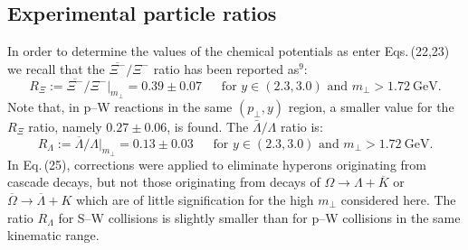 \begin{mdframed}[linecolor=gray,roundcorner=12pt,backgroundcolor=Dandelion!15,linewidth=1pt,leftmargin=0cm,rightmargin=0cm,topline=true,bottomline=true,skipabove=12pt]
\subsection*{Experimental particle ratios} 
In order to determine the values of the chemical potentials as enter
Eqs.\,(22,23) we recall that the $\overline{\Xi^-}/ \Xi^-$
ratio has been reported as$^9$:
\begin{equation}
\tag{24} R_\Xi:={\overline{\Xi^-}}/ \Xi^-|_{m_\bot} 
 = 0.39\pm 0.07\ \quad \mbox{ for }
 y\in(2.3,3.0) \mbox{ and } m_\bot>1.72\ \mbox{GeV}.
\end{equation}
Note that, in p--W reactions in the same $(p_\bot,y)$ region, a smaller
value for the $R_\Xi$ ratio, namely $0.27\pm 0.06$, is found. The ${\bar
\Lambda}/\Lambda $ ratio is:
\begin{equation}
\tag{25} R_\Lambda:={{\overline \Lambda}/\Lambda}|_{m_\bot} 
 = 0.13\pm 0.03\ \quad \mbox{ for } 
 y\in(2.3,3.0) \mbox{ and } m_\bot>1.72\ \mbox{GeV}.
\end{equation} 
In Eq.\,(25), corrections were applied to eliminate hyperons
originating from cascade decays, but not those originating from decays of
$\Omega \to \Lambda + \overline{K}$ or $\overline{\Omega} \to
\overline{\Lambda} + K$ which are of little signification for the high 
$m_\bot$ considered here. The ratio $R_\Lambda$ for S--W collisions is
slightly smaller than for p--W collisions in the same kinematic range.
 

\end{mdframed}
